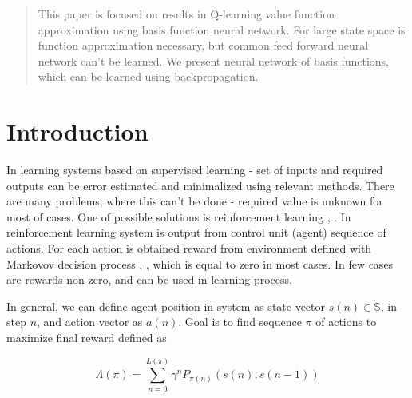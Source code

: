 \documentclass{acmbulletin}
\begin{document}
\toappear{\copyrighttext}

\maketitle
\begin{abstract}

This paper is focused on results in Q-learning value function approximation
using basis function neural network. For large state space is function
approximation necessary, but common feed forward neural network can't be learned.
We present neural network of basis functions, which can be learned using
backpropagation.

\end{abstract}



\section{Introduction}

In learning systems based on supervised learning - set of inputs and
required outputs can be error estimated and minimalized using relevant methods.
There are many problems, where this can't be done - required value is unknown for most
of cases. One of possible solutions is reinforcement  learning \cite{bib:reinforcement_leraning_01}, \cite{bib:reinforcement_leraning_02}.
In reinforcement learning system is output from control unit (agent) sequence of actions.
For each action is obtained reward from environment defined with Markovov
decision process \cite{bib:markov_01}, \cite{bib:markov_02}, which is equal to zero in most cases.
In few cases are rewards non zero, and can be used in learning process.

In general, we can define agent position in system as state vector $s(n) \in \mathbb{S}$, in step $n$,
and action vector as $a(n)$. Goal is to find sequence $\pi$ of actions to maximize
final reward defined as

\begin{equation}
\Lambda(\pi)  = \sum\limits_{n=0}^{L(\pi)}\gamma^n P_{\pi(n)}(s(n), s(n-1))
\label{eq:q_quality}
\end{equation}
\end{document}
